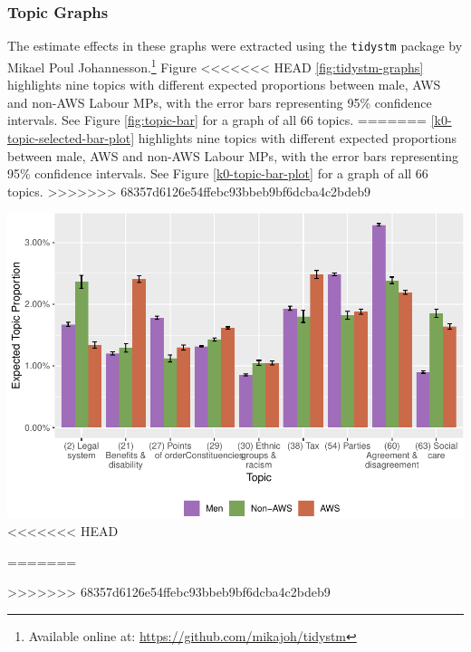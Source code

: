 \documentclass[]{article}
\let\rmarkdownfootnote\footnote%
\def\footnote{\protect\rmarkdownfootnote}
\let\origfigure\figure
\let\endorigfigure\endfigure
\renewenvironment{figure}[1][2] {
    \expandafter\origfigure\expandafter[H]
} {
    \endorigfigure
}
\theoremstyle{definition}
\theoremstyle{definition}
\theoremstyle{definition}
\theoremstyle{remark}
\begin{document}
\begin{table}[H]
\begin{table}[H]
\begin{table}[H]
\begin{table}[H]
\begin{table}[H]
\begin{table}[H]
\begin{table}[H]
\begin{table}[H]
\begin{figure}
\begin{longtabu}
\hypertarget{topic-graphs}{%
\subsubsection{Topic Graphs}\label{topic-graphs}}

The estimate effects in these graphs were extracted using the
\texttt{tidystm} package by Mikael Poul Johannesson.\footnote{Available
  online at: \url{https://github.com/mikajoh/tidystm}} Figure
<<<<<<< HEAD
\ref{fig:tidystm-graphs} highlights nine topics with different expected
proportions between male, AWS and non-AWS Labour MPs, with the error
bars representing 95\% confidence intervals. See Figure
\ref{fig:topic-bar} for a graph of all 66 topics.
=======
\ref{k0-topic-selected-bar-plot} highlights nine topics with different
expected proportions between male, AWS and non-AWS Labour MPs, with the
error bars representing 95\% confidence intervals. See Figure
\ref{k0-topic-bar-plot} for a graph of all 66 topics.
>>>>>>> 68357d6126e54ffebc93bbeb9bf6dcba4c2bdeb9

\begin{figure}
\centering
\includegraphics{methodology_files/figure-latex/tidystm-graphs-1.pdf}
<<<<<<< HEAD
\caption{\label{fig:tidystm-graphs}Selected Topic Proportions}
=======
\caption{\label{k0-topic-selected-bar-plot}Selected Topic Proportions}
>>>>>>> 68357d6126e54ffebc93bbeb9bf6dcba4c2bdeb9
\end{figure}


\end{longtabu}
\end{figure}
\end{table}
\end{table}
\end{table}
\end{table}
\end{table}
\end{table}
\end{table}
\end{table}
\end{document}
